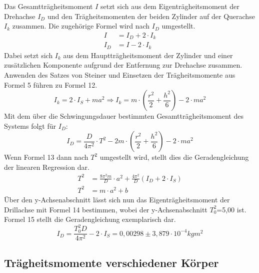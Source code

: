 \documentclass[titlepage = firstcover]{scrartcl}
\begin{document}
      Das Gesamtträgheitsmoment $I$ setzt sich aus dem Eigenträgheitsmoment der Drehachse $I_D$ und den Trägheitsmomenten der beiden Zylinder auf der Querachse 
      $I_k$ zusammen. Die zugehörige Formel wird nach $I_D$ umgestellt.
      \begin{align*}
        I &= I_D + 2 \cdot I_k \\
        I_D &= I -2 \cdot I_k
      \end{align*}
      Dabei setzt sich $I_k$ aus dem Hauptträgheitsmoment der Zylinder und einer zusätzlichen Komponente aufgrund der Entfernung zur Drehachse zusammen.
      Anwenden des Satzes von Steiner und Einsetzen der Trägheitsmomente aus Formel 5 führen zu Formel 12.
      \begin{equation}
        I_k = 2 \cdot I_S + ma^2 \Rightarrow I_k = m \cdot (\frac{r^2}{2} + \frac{h^2}{6}) - 2 \cdot ma^2
      \end{equation}
      Mit dem über die Schwingungsdauer bestimmten Gesamtträgheitsmoment des Systems folgt für $I_D$:
      \begin{equation}
        I_D = \frac{D}{4\pi^2} \cdot T^2 - 2m \cdot (\frac{r^2}{2} + \frac{h^2}{6}) - 2 \cdot ma^2
      \end{equation}
      Wenn Formel 13 dann nach $T^2$ umgestellt wird, stellt dies die Geradengleichung der linearen Regression dar.
      \begin{align}
        T^2 &= \frac{8\pi^2m}{D} \cdot a^2  + \frac{4\pi^2}{D}(I_D + 2 \cdot I_S) \\
        T^2 &= m \cdot a^2 + b
      \end{align}
      Über den y-Achsenabschnitt lässt sich nun das Eigenträgheitsmoment der Drillachse mit Formel 14 bestimmen, wobei der y-Achsenabschnitt $T_0^2$=5,00 ist.
      Formel 15 stellt die Geradengleichung exemplarisch dar.
      \begin{equation*}
        I_D = \frac{T_0^2D}{4\pi^2} - 2 \cdot I_S = 0,00298 \pm 3,879 \cdot 10^{-4}kgm^2
      \end{equation*}
      

      \subsection{Trägheitsmomente verschiedener Körper}
      
     
      
\end{document}
